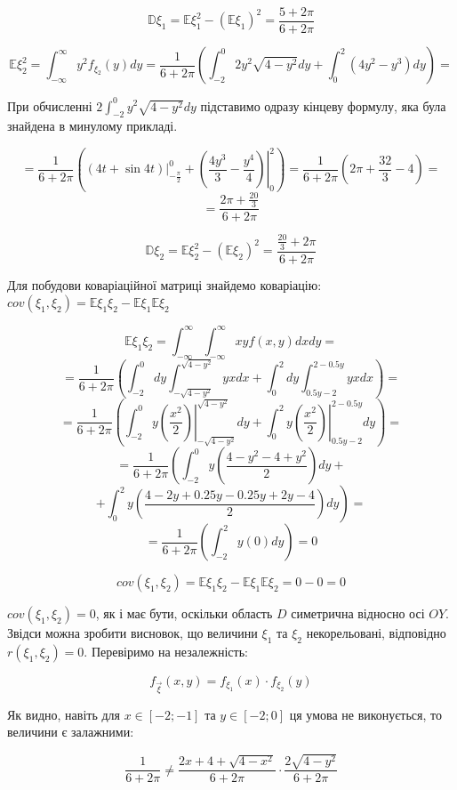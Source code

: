 \documentclass[14pt, a4paper, ukrainian]{extreport}
\begin{document}
	$$\mathbb{D}\xi_1 = \mathbb{E}\xi_1^2 - (\mathbb{E}\xi_1)^2 =\frac{5 + 2\pi}{6+2\pi} 
	$$	
	
	$$\mathbb{E}\xi_2^2 = \int_{-\infty}^{\infty}y^2f_{\xi_2}(y)dy = \frac{1}{6+2\pi}\left(\int_{-2}^{0}2y^2\sqrt{4-y^2}dy + \int_{0}^{2}(4y^2-y^3)dy\right) =$$
	
	При обчисленні $2\int_{-2}^{0}y^2\sqrt{4-y^2}dy$ підставимо одразу кінцеву формулу, яка була знайдена в минулому прикладі.
	
	$$ = \frac{1}{6 + 2\pi}\left(\left.\left(4t + \sin{4t}\right)\right|_{-\frac{\pi}{2}}^{0} + \left.\left(\frac{4y^3}{3} - \frac{y^4}{4}\right)\right|_0^2 \right) = 
	\frac{1}{6 + 2\pi}\left(2\pi + \frac{32}{3} - 4 \right) = 
	$$
	$$ = \frac{2\pi + \frac{20}{3} }{6 + 2\pi}$$
	
	$$\mathbb{D}\xi_2 = \mathbb{E}\xi_2^2 - (\mathbb{E}\xi_2)^2 = \frac{\frac{20}{3} + 2\pi}{6+2\pi}
	$$	
	
	Для побудови коваріаційної матриці знайдемо коваріацію:\\ $cov(\xi_1, \xi_2) = \mathbb{E}\xi_1\xi_2 - \mathbb{E}\xi_1\mathbb{E}\xi_2$
 		
 	$$\mathbb{E}\xi_1\xi_2 = \int_{-\infty}^{\infty}\int_{-\infty}^{\infty}xyf(x, y)dxdy = $$
 	$$ =  \frac{1}{6+2\pi} \left(\int_{-2}^{0}dy\int_{-\sqrt{4-y^2}}^{\sqrt{4-y^2}}yxdx + \int_{0}^{2}dy\int_{0.5y-2}^{2-0.5y}yxdx\right) = 
 	$$
 	$$ = \frac{1}{6+2\pi} \left(\int_{-2}^{0}y\left.\left(\frac{x^2}{2}\right)\right|_{-\sqrt{4-y^2}}^{\sqrt{4-y^2}}dy+ \int_{0}^{2}y\left.\left(\frac{x^2}{2}\right)\right|_{0.5y-2}^{2-0.5y}dy \right)= 
 	$$
 	$$ = \frac{1}{6+2\pi} \left(\int_{-2}^{0}y\left(\frac{4-y^2 - 4 + y^2}{2}\right)dy \right.+ 
 	$$
 	$$ + \left.\int_{0}^{2}y\left(\frac{4 - 2y + 0.25y - 0.25y + 2y - 4}{2}\right)dy\right) = 
 	$$
 	$$ =\frac{1}{6+2\pi}\left(\int_{-2}^{2}y(0)dy\right) = 0$$
 	
 	$$cov(\xi_1, \xi_2) = \mathbb{E}\xi_1\xi_2 - \mathbb{E}\xi_1\mathbb{E}\xi_2 = 0 - 0 = 0$$
 		
 	$cov(\xi_1, \xi_2) = 0$, як і має бути, оскільки область $D$ симетрична відносно осі $OY$. Звідси можна зробити висновок, що величини $\xi_1$ та $\xi_2$ некорельовані, відповідно $r(\xi_1, \xi_2) = 0$. Перевіримо на незалежність:
 	
 	$$f_{\vec \xi}(x, y) = f_{\xi_1}(x) \cdot f_{\xi_2}(y) $$
 	
 	Як видно, навіть для $ x \in [-2; -1] $ та $ y \in [-2; 0]$ ця умова не виконується, то величини є залажними:
 	
 	$$ \frac{1}{6+2\pi} \neq \frac{2x + 4 + \sqrt{4 - x^2}}{6+2\pi} \cdot \frac{2\sqrt{4-y^2}}{6+2\pi}$$ 
 	
\end{document}
